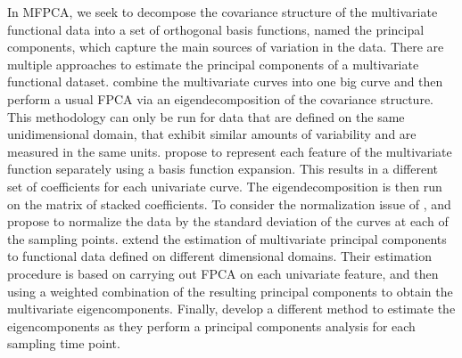 In MFPCA, we seek to decompose the covariance structure of the multivariate functional data into a set of orthogonal basis functions, named the principal components, which capture the main sources of variation in the data. There are multiple approaches to estimate the principal components of a multivariate functional dataset. \cite{ramsayFunctionalDataAnalysis2005} combine the multivariate curves into one big curve and then perform a usual FPCA via an eigendecomposition of the covariance structure. This methodology can only be run for data that are defined on the same unidimensional domain, that exhibit similar amounts of variability and are measured in the same units. \cite{jacquesModelbasedClusteringMultivariate2014a} propose to represent each feature of the multivariate function separately using a basis function expansion. This results in a different set of coefficients for each univariate curve. The eigendecomposition is then run on the matrix of stacked coefficients. To consider the normalization issue of \cite{ramsayFunctionalDataAnalysis2005}, \cite{jacquesModelbasedClusteringMultivariate2014a} and \cite{chiouMultivariateFunctionalPrincipal2014} propose to normalize the data by the standard deviation of the curves at each of the sampling points. \cite{happMultivariateFunctionalPrincipal2018a} extend the estimation of multivariate principal components to functional data defined on different dimensional domains. Their estimation procedure is based on carrying out FPCA on each univariate feature, and then using a weighted combination of the resulting principal components to obtain the multivariate eigencomponents. Finally, \cite{berrenderoPrincipalComponentsMultivariate2011} develop a different method to estimate the eigencomponents as they perform a principal components analysis for each sampling time point.


